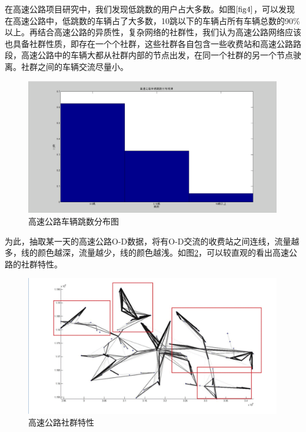 				在高速公路项目研究中，我们发现低跳数的用户占大多数。如图$\ref{fig4}$，可以发现在高速公路中，低跳数的车辆占了大多数，10跳以下的车辆占所有车辆总数的90\%以上。再结合高速公路的异质性，复杂网络的社群性，我们认为高速公路网络应该也具备社群性质，即存在一个个社群，这些社群各自包含一些收费站和高速公路路段，高速公路中的车辆大都从社群内部的节点出发，在同一个社群的另一个节点驶离。社群之间的车辆交流尽量小。

				\begin{figure}[h]
				\centering
						\begin{minipage}{0.8\linewidth}
							\centering
							\includegraphics[width=4.4in]{picture/tiaoshu}
							\caption{高速公路车辆跳数分布图}
							\label{fig4}
						\end{minipage}%
				\end{figure}

				为此，抽取某一天的高速公路O-D数据，将有O-D交流的收费站之间连线，流量越多，线的颜色越深，流量越少，线的颜色越浅。如图\ref{fig5}，可以较直观的看出高速公路的社群特性。

				\begin{figure}[h]
				\centering
						\begin{minipage}{0.8\linewidth}
							\centering
							\includegraphics[width=4.4in]{picture/shequntexing}
							\caption{高速公路社群特性}
							\label{fig5}
						\end{minipage}%
				\end{figure}


